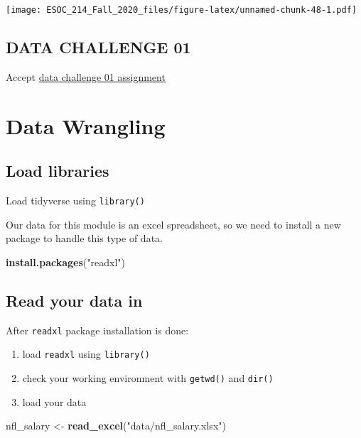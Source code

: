 \documentclass[
]{book}
\newenvironment{Shaded}{\begin{snugshade}}{\end{snugshade}}
\newcommand{\KeywordTok}[1]{\textcolor[rgb]{0.13,0.29,0.53}{\textbf{#1}}}
\newcommand{\NormalTok}[1]{#1}
\newcommand{\StringTok}[1]{\textcolor[rgb]{0.31,0.60,0.02}{#1}}
\begin{document}
\texttt{[image: ESOC\_214\_Fall\_2020\_files/figure-latex/unnamed-chunk-48-1.pdf]}

\hypertarget{data-challenge-01}{%
\section{DATA CHALLENGE 01}\label{data-challenge-01}}

Accept \href{https://classroom.github.com/a/0CjzlvtW}{data challenge 01 assignment}

\hypertarget{data-wrangling}{%
\chapter{Data Wrangling}\label{data-wrangling}}

\hypertarget{load-libraries}{%
\section{Load libraries}\label{load-libraries}}

Load tidyverse using \texttt{library()}

Our data for this module is an excel spreadsheet, so we need to install a new package to handle this type of data.

\begin{Shaded}
\begin{Highlighting}[]
\KeywordTok{install.packages}\NormalTok{(}\StringTok{"readxl"}\NormalTok{)}
\end{Highlighting}
\end{Shaded}

\hypertarget{read-your-data-in}{%
\section{Read your data in}\label{read-your-data-in}}

After \texttt{readxl} package installation is done:

\begin{enumerate}
\def\labelenumi{\arabic{enumi}.}
\item
  load \texttt{readxl} using \texttt{library()}
\item
  check your working environment with \texttt{getwd()} and \texttt{dir()}
\item
  load your data
\end{enumerate}

\begin{Shaded}
\begin{Highlighting}[]
\NormalTok{nfl_salary <-}\StringTok{ }\KeywordTok{read_excel}\NormalTok{(}\StringTok{"data/nfl_salary.xlsx"}\NormalTok{)}
\end{Highlighting}
\end{Shaded}
\end{document}
